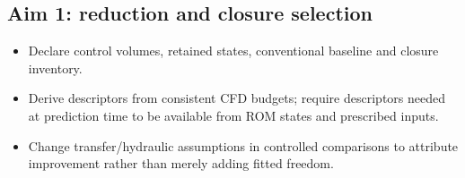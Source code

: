 \subsection{Aim 1: reduction and closure selection}\label{subsec:aim-1-reduction-and-closure-selection}

\begin{itemize}[leftmargin=*]
\item Declare control volumes, retained states, conventional baseline and closure inventory.
\item Derive descriptors from consistent CFD budgets; require descriptors needed at prediction time to be available from ROM states and prescribed inputs.
\item Change transfer/\allowbreak{}hydraulic assumptions in controlled comparisons to attribute improvement rather than merely adding fitted freedom.


\end{itemize}
